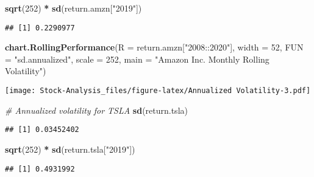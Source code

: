 \documentclass[
]{article}
\newenvironment{Shaded}{\begin{snugshade}}{\end{snugshade}}
\newcommand{\CommentTok}[1]{\textcolor[rgb]{0.56,0.35,0.01}{\textit{#1}}}
\newcommand{\DataTypeTok}[1]{\textcolor[rgb]{0.13,0.29,0.53}{#1}}
\newcommand{\DecValTok}[1]{\textcolor[rgb]{0.00,0.00,0.81}{#1}}
\newcommand{\KeywordTok}[1]{\textcolor[rgb]{0.13,0.29,0.53}{\textbf{#1}}}
\newcommand{\NormalTok}[1]{#1}
\newcommand{\OperatorTok}[1]{\textcolor[rgb]{0.81,0.36,0.00}{\textbf{#1}}}
\newcommand{\StringTok}[1]{\textcolor[rgb]{0.31,0.60,0.02}{#1}}
\begin{document}
\begin{Shaded}
\begin{Highlighting}[]
\KeywordTok{sqrt}\NormalTok{(}\DecValTok{252}\NormalTok{) }\OperatorTok{*}\StringTok{ }\KeywordTok{sd}\NormalTok{(return.amzn[}\StringTok{"2019"}\NormalTok{])}
\end{Highlighting}
\end{Shaded}

\begin{verbatim}
## [1] 0.2290977
\end{verbatim}

\begin{Shaded}
\begin{Highlighting}[]
\KeywordTok{chart.RollingPerformance}\NormalTok{(}\DataTypeTok{R =}\NormalTok{ return.amzn[}\StringTok{"2008::2020"}\NormalTok{],}
                         \DataTypeTok{width =} \DecValTok{52}\NormalTok{,}
                         \DataTypeTok{FUN =} \StringTok{"sd.annualized"}\NormalTok{,}
                         \DataTypeTok{scale =} \DecValTok{252}\NormalTok{,}
                         \DataTypeTok{main =} \StringTok{"Amazon Inc. Monthly Rolling Volatility"}\NormalTok{)}
\end{Highlighting}
\end{Shaded}

\texttt{[image: Stock-Analysis\_files/figure-latex/Annualized Volatility-3.pdf]}

\begin{Shaded}
\begin{Highlighting}[]
\CommentTok{# Annualized volatility for TSLA}
\KeywordTok{sd}\NormalTok{(return.tsla)}
\end{Highlighting}
\end{Shaded}

\begin{verbatim}
## [1] 0.03452402
\end{verbatim}

\begin{Shaded}
\begin{Highlighting}[]
\KeywordTok{sqrt}\NormalTok{(}\DecValTok{252}\NormalTok{) }\OperatorTok{*}\StringTok{ }\KeywordTok{sd}\NormalTok{(return.tsla[}\StringTok{"2019"}\NormalTok{])}
\end{Highlighting}
\end{Shaded}

\begin{verbatim}
## [1] 0.4931992
\end{verbatim}
\end{document}
